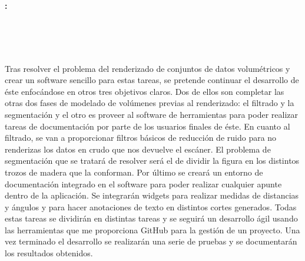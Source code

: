 \chapter*{}



\cleardoublepage
\thispagestyle{empty}

\begin{center}
{\large\bfseries \myTitle: \mySubtitle}\\
\end{center}

\begin{center}
\myName \\
\end{center}

\vspace{0.7cm}
\\

\vspace{0.7cm}
\\

Tras resolver el problema del renderizado de conjuntos de datos volumétricos y crear un software sencillo para estas tareas, se pretende continuar el desarrollo de éste enfocándose en otros tres objetivos claros. Dos de ellos son completar las otras dos fases de modelado de volúmenes previas al renderizado: el filtrado y la segmentación y el otro es proveer al software de herramientas para poder realizar tareas de documentación por parte de los usuarios finales de éste. En cuanto al filtrado, se van a proporcionar filtros básicos de reducción de ruido para no renderizas los datos en crudo que nos devuelve el escáner. El problema de segmentación que se tratará de resolver será el de dividir la figura en los distintos trozos de madera que la conforman. Por último se creará un entorno de documentación integrado en el software para poder realizar cualquier apunte dentro de la aplicación. Se integrarán widgets para realizar medidas de distancias y ángulos y para hacer anotaciones de texto en distintos cortes generados. Todas estas tareas se dividirán en distintas tareas y se seguirá un desarrollo ágil usando las herramientas que me proporciona GitHub para la gestión de un proyecto. Una vez terminado el desarrollo se realizarán una serie de pruebas y se documentarán los resultados obtenidos.

